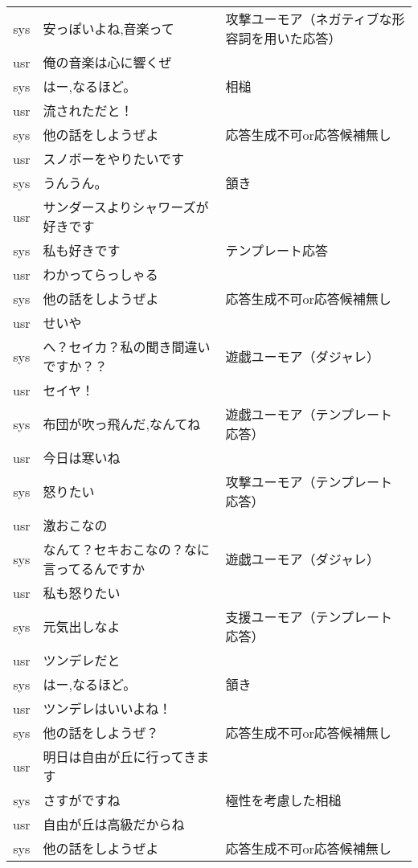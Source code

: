 \begin{longtable}{| c | p{} | p{}|}
sys & 安っぽいよね,音楽って & 攻撃ユーモア（ネガティブな形容詞を用いた応答）\\
usr & 俺の音楽は心に響くぜ & \\
sys & はー,なるほど。 & 相槌\\
usr & 流されただと！ & \\
sys & 他の話をしようぜよ & 応答生成不可or応答候補無し\\
usr & スノボーをやりたいです & \\
sys & うんうん。 & 頷き\\
usr & サンダースよりシャワーズが好きです & \\
sys & 私も好きです & テンプレート応答\\
usr & わかってらっしゃる & \\
sys & 他の話をしようぜよ & 応答生成不可or応答候補無し\\
usr & せいや & \\
sys & へ？セイカ？私の聞き間違いですか？？ & 遊戯ユーモア（ダジャレ）\\
usr & セイヤ！ & \\
sys & 布団が吹っ飛んだ,なんてね & 遊戯ユーモア（テンプレート応答）\\
usr & 今日は寒いね & \\
sys & 怒りたい & 攻撃ユーモア（テンプレート応答）\\
usr & 激おこなの & \\
sys & なんて？セキおこなの？なに言ってるんですか & 遊戯ユーモア（ダジャレ）\\
usr & 私も怒りたい & \\
sys & 元気出しなよ & 支援ユーモア（テンプレート応答）\\
usr & ツンデレだと & \\
sys & はー,なるほど。 & 頷き\\
usr & ツンデレはいいよね！ & \\
sys & 他の話をしようぜ？ & 応答生成不可or応答候補無し\\
usr & 明日は自由が丘に行ってきます & \\
sys & さすがですね & 極性を考慮した相槌\\
usr & 自由が丘は高級だからね & \\
sys & 他の話をしようぜよ & 応答生成不可or応答候補無し\\
\hline
\end{longtable}

